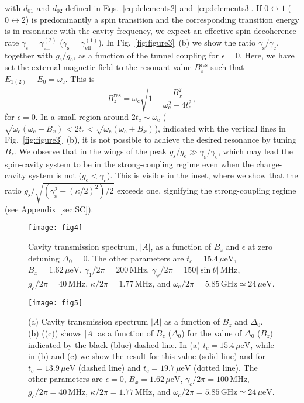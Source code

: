 \documentclass[twocolumn,english,aps,prl,preprint,reprint,showpacs,longbibliography,showkeys]{revtex4-1}
\begin{document}
with $d_{01}$ and $d_{02}$ defined in Eqs.~\eqref{eq:delements2} and~\eqref{eq:delements3}.
If  $0\leftrightarrow 1$ ($0\leftrightarrow 2$) is predominantly a spin transition and the corresponding transition energy  is in resonance with the cavity frequency, we expect an effective spin decoherence rate $\gamma_{\mathrm{s}}=\gamma_{\mathrm{eff}}^{(2)}$ ($\gamma_{\mathrm{s}}=\gamma_{\mathrm{eff}}^{(1)}$). 
In Fig.~\ref{fig:figure3}~(b) we show the ratio $\gamma_{\mathrm{s}}/\gamma_{\mathrm{c}}$, together with $g_{\mathrm{s}}/g_{\mathrm{c}}$, as a function of the tunnel coupling for $\epsilon=0$. Here, we have set the  external  magnetic field to the resonant value $B_z^{\mathrm{res}}$  such that $E_{1(2)}-E_0=\omega_{\mathrm{c}}$. This is
\begin{equation}
B_z^{\mathrm{res}}=\omega_{\mathrm{c}}\sqrt{1-\frac{B_x^2}{\omega_{\mathrm{c}}^2-4t_c^2}}, \label{eq:resonant-field}
\end{equation} 
for $\epsilon=0$. In a small region around $2t_c\sim \omega_{\mathrm{c}}$ ($\sqrt{\omega_{\mathrm{c}}(\omega_{\mathrm{c}}-B_x)}<2t_c<\sqrt{\omega_{\mathrm{c}}(\omega_{\mathrm{c}}+B_x)}$), indicated with the vertical lines in Fig.~\ref{fig:figure3}~(b), it is not possible to achieve the desired resonance by tuning $B_z$. 
We observe that in the wings  of the peak $g_{\mathrm{s}}/g_{\mathrm{c}}\gg \gamma_{\mathrm{s}}/\gamma_{\mathrm{c}}$, which may lead the spin-cavity system to be in the strong-coupling regime even when the charge-cavity system is not ($g_{\mathrm{c}}<\gamma_{\mathrm{c}}$).
This is visible  in the inset, where we show that the ratio $g_{\mathrm{s}}/\sqrt{(\gamma_{\mathrm{s}}^2+(\kappa/2)^2)/2}$  exceeds one,  signifying the strong-coupling regime (see Appendix~\ref{sec:SC}).
 
\begin{figure}
\texttt{[image: fig4]}
\protect\caption{\label{fig:figure4}Cavity transmission spectrum, $|A|$, as a function of $B_z$ and $\epsilon$ at zero detuning $\Delta_0=0$. The other parameters are $t_c=15.4\,\mu\mathrm{eV}$, $B_x=1.62\,\mu\mathrm{eV}$, $\gamma_1/2\pi=200\,\mathrm{MHz}$, $\gamma_{\phi}/2\pi=150|\sin{\theta}|\,\mathrm{MHz}$, $g_c/2\pi=40\,\mathrm{MHz}$, $\kappa/2\pi=1.77\,\mathrm{MHz}$, and $\omega_{\mathrm{c}}/2\pi=5.85\,\mathrm{GHz}\simeq 24\,\mu\mathrm{eV}$.}
\end{figure}

\begin{figure}
\texttt{[image: fig5]}
\protect\caption{\label{fig:figure2}(a) Cavity transmission spectrum $|A|$ as a function of $B_z$ and $\Delta_0$. (b) ((c)) shows $|A|$ as a function of $B_z$ ($\Delta_0$) for the value of $\Delta_0$ ($B_z$) indicated by the black (blue) dashed line.
In (a)  $t_c=15.4\,\mu\mathrm{eV}$, while in (b) and (c) we show the result for this value (solid line) and for $t_c=13.9\,\mu\mathrm{eV}$ (dashed line) and $t_c=19.7\,\mu\mathrm{eV}$ (dotted line).  The other parameters are $\epsilon=0$, $B_x=1.62\,\mu\mathrm{eV}$, $\gamma_c/2\pi=100\,\mathrm{MHz}$, $g_c/2\pi=40\,\mathrm{MHz}$, $\kappa/2\pi=1.77\,\mathrm{MHz}$, and $\omega_{\mathrm{c}}/2\pi=5.85\,\mathrm{GHz}\simeq 24\,\mu\mathrm{eV}$.}
\end{figure}
\end{document}
